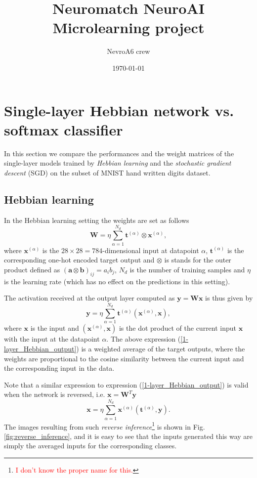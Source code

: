 \documentclass[a4paper, 11pt]{article}
\title{\textbf{Neuromatch NeuroAI Microlearning project}}
\date{\today}
\author{NevroA6 crew}
\begin{document}
\maketitle

\begin{abstract}
\end{abstract}

\tableofcontents

\section{Single-layer Hebbian network vs. softmax classifier}
In this section we compare the performances and the weight matrices of the single-layer models trained by {\it Hebbian learning} and the {\it stochastic gradient descent} (SGD) on the subset of MNIST hand written digits dataset.
\subsection{Hebbian learning}
In the Hebbian learning setting the weights are set as follows
\begin{equation} \label{Hebbian_weights}
  \mathbf W = \eta\sum_{\alpha=1}^{N_d} \mathbf t^{(\alpha)} \otimes \mathbf x^{(\alpha)},
\end{equation}
where $\mathbf x^{(\alpha)}$ is the $28\times 28=784$-dimensional input at datapoint $\alpha$, $\mathbf t^{(\alpha)}$ is the corresponding one-hot encoded target output and $\otimes$ is stands for the outer product defined as $(\mathbf a\otimes \mathbf b)_{ij} = a_ib_j$, ${N_d}$ is the number of training samples and $\eta$ is the learning rate (which has no effect on the predictions in this setting).

The activation received at the output layer computed as $\mathbf y = \mathbf W\mathbf x$ is thus given by
\begin{equation} \label{1-layer_Hebbian_output}
  \mathbf y = \eta \sum_{\alpha=1}^{N_d}\mathbf t^{(\alpha)}(\mathbf x^{(\alpha)},\mathbf x),
\end{equation}
where $\mathbf x$ is the input and $(\mathbf x^{(\alpha)},\mathbf x)$ is the dot product of the current input $\mathbf x$ with the input at the datapoint $\alpha$. The above expression (\ref{1-layer_Hebbian_output}) is a weighted average of the target outputs, where the weights are proportional to the cosine similarity between the current input and the corresponding input in the data.

Note that a similar expression to expression (\ref{1-layer_Hebbian_output}) is valid when the network is reversed, i.e. $\mathbf x = \mathbf W^T\mathbf y$
\begin{equation}
  \mathbf x = \eta\sum_{\alpha=1}^{N_d}\mathbf x^{(\alpha)}(\mathbf t^{(\alpha)},\mathbf y).
\end{equation}
The images resulting from such {\it reverse inference}\footnote{\textcolor{red}{I don't know the proper name for this.}} is shown in Fig.\ref{fig:reverse_inference}, and it is easy to see that the inputs generated this way are simply the averaged inputs for the corresponding classes.
\end{document}
